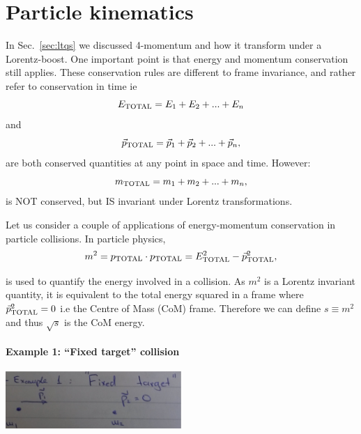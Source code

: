 \section{Particle kinematics}
In Sec.~\ref{sec:ltqs} we discussed 4-momentum and how
it transform under a Lorentz-boost. One important point
is that energy and momentum conservation still applies. These
conservation rules are different to frame invariance, and rather
refer to conservation in time ie
\[
E_{\rm TOTAL}=E_{1}+E_{2}+...+E_{n}
\]
and 
\[
\vec{p}_{\rm TOTAL}=\vec{p}_{1}+\vec{p}_{2}+...+\vec{p}_{n},
\]
are both conserved quantities at any point in space and time.
However:
\[
m_{\rm TOTAL}=m_{1}+m_{2}+...+m_{n},
\]
is NOT conserved, but IS invariant under Lorentz transformations.

\noindent Let us consider a couple of applications of energy-momentum conservation
in particle collisions. In particle physics,
\noindent 
\[
m^{2}=p_{\rm TOTAL}\cdot p_{\rm TOTAL}=E^{2}_{\rm TOTAL}-\vec{p}^{2}_{\rm TOTAL},
\]

is used to quantify the energy involved in a collision. As $m^{2}$ is a Lorentz invariant quantity, 
it is equivalent to the total energy squared in a frame where $\vec{p}^{2}_{\rm TOTAL}=0$ 
i.e the Centre of Mass (CoM) frame. Therefore we can define $s\equiv m^2$ and  thus $\sqrt{s}$ is the CoM energy.

\paragraph{Example 1: ``Fixed target'' collision}
\begin{center}
\includegraphics[width=0.5\textwidth]{fig/collisions/collisions_example1.jpg}
\end{center}

